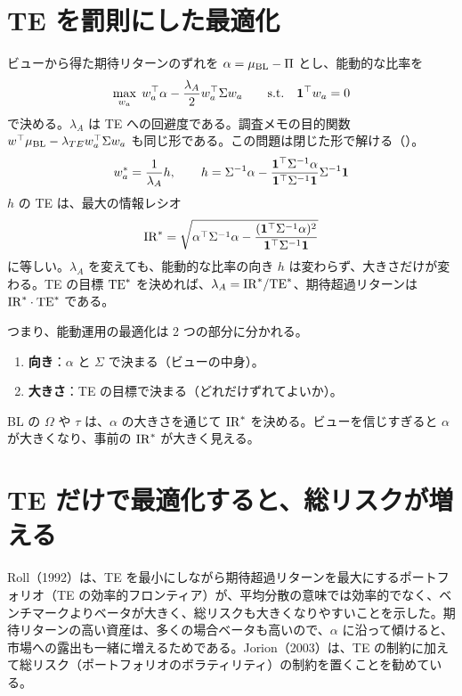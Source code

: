 \section{TE を罰則にした最適化}

ビューから得た期待リターンのずれを $\alpha=\mu_{\mathrm{BL}}-\Pi$ とし、能動的な比率を
\begin{equation}
\max_{w_a}\;w_a^{\top}\alpha-\frac{\lambda_A}{2}w_a^{\top}\Sigma w_a\qquad\text{s.t.}\quad \mathbf{1}^{\top} w_a=0
\label{eq:active-opt}
\end{equation}
で決める。$\lambda_A$ は TE への回避度である。調査メモの目的関数 $w^{\top}\mu_{\mathrm{BL}}-\lambda_{TE}w_a^{\top}\Sigma w_a$ も同じ形である。この問題は閉じた形で解ける（）。
\begin{equation}
w_a^*=\frac{1}{\lambda_A}h,\qquad h=\Sigma^{-1}\alpha-\frac{\mathbf{1}^{\top}\Sigma^{-1}\alpha}{\mathbf{1}^{\top}\Sigma^{-1}\mathbf{1}}\Sigma^{-1}\mathbf{1}
\end{equation}
$h$ の TE は、最大の情報レシオ
\begin{equation}
\mathrm{IR}^*=\sqrt{\alpha^{\top}\Sigma^{-1}\alpha-\frac{(\mathbf{1}^{\top}\Sigma^{-1}\alpha)^2}{\mathbf{1}^{\top}\Sigma^{-1}\mathbf{1}}}
\label{eq:ir-star}
\end{equation}
に等しい。$\lambda_A$ を変えても、能動的な比率の向き $h$ は変わらず、大きさだけが変わる。TE の目標 $\mathrm{TE}^*$ を決めれば、$\lambda_A=\mathrm{IR}^*/\mathrm{TE}^*$、期待超過リターンは $\mathrm{IR}^*\cdot\mathrm{TE}^*$ である。

つまり、能動運用の最適化は 2 つの部分に分かれる。

\begin{enumerate}
\item \textbf{向き}：$\alpha$ と $\Sigma$ で決まる（ビューの中身）。
\item \textbf{大きさ}：TE の目標で決まる（どれだけずれてよいか）。
\end{enumerate}

BL の $\Omega$ や $\tau$ は、$\alpha$ の大きさを通じて $\mathrm{IR}^*$ を決める。ビューを信じすぎると $\alpha$ が大きくなり、事前の $\mathrm{IR}^*$ が大きく見える。

\section{TE だけで最適化すると、総リスクが増える}

Roll（1992）は、TE を最小にしながら期待超過リターンを最大にするポートフォリオ（TE の効率的フロンティア）が、平均分散の意味では効率的でなく、ベンチマークよりベータが大きく、総リスクも大きくなりやすいことを示した。期待リターンの高い資産は、多くの場合ベータも高いので、$\alpha$ に沿って傾けると、市場への露出も一緒に増えるためである。Jorion（2003）は、TE の制約に加えて総リスク（ポートフォリオのボラティリティ）の制約を置くことを勧めている。

